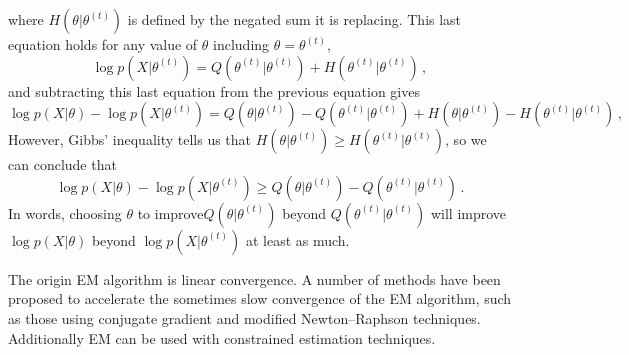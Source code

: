 \documentclass[11pt]{article}
\begin{document}
where $H(\theta|\theta^{(t)})$ is defined by the negated sum it is replacing. This last equation holds for any value of $\theta$ including $\theta = \theta^{(t)}$,
$$
        \log p({X}|\theta^{(t)}) = Q(\theta^{(t)}|\theta^{(t)}) + H(\theta^{(t)}|\theta^{(t)}) \,, 
$$
and subtracting this last equation from the previous equation gives
$$
        \log p({X}|\theta) - \log p({X}|\theta^{(t)}) = Q(\theta|\theta^{(t)}) - Q(\theta^{(t)}|\theta^{(t)}) + H(\theta|\theta^{(t)}) - H(\theta^{(t)}|\theta^{(t)}) \,, 
$$
However, Gibbs' inequality tells us that $H(\theta|\theta^{(t)}) \ge H(\theta^{(t)}|\theta^{(t)})$, so we can conclude that
$$
        \log p({X}|\theta) - \log p({X}|\theta^{(t)}) \ge Q(\theta|\theta^{(t)}) - Q(\theta^{(t)}|\theta^{(t)}) \,. 
$$
In words, choosing $\theta$ to improve$ Q(\theta|\theta^{(t)})$ beyond $Q(\theta^{(t)}|\theta^{(t)})$ will improve $\log p({X}|\theta)$ beyond $\log p({X}|\theta^{(t)})$ at least as much.

The origin EM algorithm is linear convergence. A number of methods have been proposed to accelerate the sometimes slow convergence of the EM algorithm, such as those using conjugate gradient and modified Newton–Raphson techniques. Additionally EM can be used with constrained estimation techniques.
\end{document}
